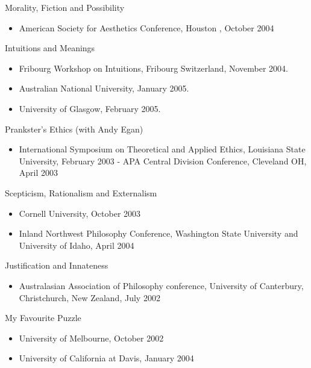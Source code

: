 \documentclass[
  10pt,
  letterpaper,
  DIV=11,
  numbers=noendperiod,
  twoside]{scrartcl}
\providecommand{\tightlist}{%
  \setlength{\itemsep}{0pt}\setlength{\parskip}{0pt}}\usepackage{longtable,booktabs,array}
\begin{document}
Morality, Fiction and Possibility

\begin{itemize}
\tightlist
\item
  American Society for Aesthetics Conference, Houston , October 2004
\end{itemize}

Intuitions and Meanings

\begin{itemize}
\tightlist
\item
  Fribourg Workshop on Intuitions, Fribourg Switzerland, November 2004.
\item
  Australian National University, January 2005.
\item
  University of Glasgow, February 2005.
\end{itemize}

Prankster's Ethics (with Andy Egan)

\begin{itemize}
\tightlist
\item
  International Symposium on Theoretical and Applied Ethics, Louisiana
  State University, February 2003 - APA Central Division Conference,
  Cleveland OH, April 2003
\end{itemize}

Scepticism, Rationalism and Externalism

\begin{itemize}
\tightlist
\item
  Cornell University, October 2003
\item
  Inland Northwest Philosophy Conference, Washington State University
  and University of Idaho, April 2004
\end{itemize}

Justification and Innateness

\begin{itemize}
\tightlist
\item
  Australasian Association of Philosophy conference, University of
  Canterbury, Christchurch, New Zealand, July 2002
\end{itemize}

\newpage

My Favourite Puzzle

\begin{itemize}
\tightlist
\item
  University of Melbourne, October 2002
\item
  University of California at Davis, January 2004
\end{itemize}
\end{document}

